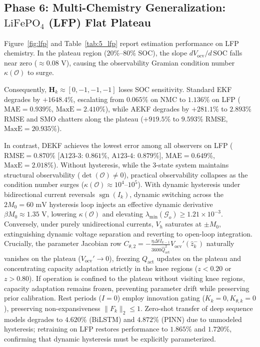 \documentclass[balance,nocopyright,upint,varvw,hyphenate,barcolor=NavyBlue,nolists]{asmejour}
\begin{document}
\subsection[Phase 6: Multi-Chemistry Generalization: LiFePO4 (LFP) Flat Plateau]{Phase 6: Multi-Chemistry Generalization: $\text{LiFePO}_4$ (LFP) Flat Plateau}
Figure~\ref{fig:lfp} and Table~\ref{tab:5_lfp} report estimation performance on LFP chemistry. In the plateau region ($20\%\text{--}80\%$ SOC), the slope $d V_{\text{ocv}} / d\,\text{SOC}$ falls near zero ($\approx 0.08\text{ V}$), causing the observability Gramian condition number $\kappa(\mathcal{O})$ to surge. 

Consequently, $\mathbf{H}_k \approx [0, -1, -1, -1]$ loses SOC sensitivity. Standard EKF degrades by $+1648.4\%$, escalating from $0.065\%$ on NMC to $1.136\%$ on LFP ($\text{MAE} = 0.939\%$, $\text{MaxE} = 2.410\%$), while AEKF degrades by $+281.1\%$ to $2.893\%$ RMSE and SMO chatters along the plateau ($+919.5\%$ to $9.593\%$ RMSE, $\text{MaxE} = 20.935\%$). 

In contrast, DEKF achieves the lowest error among all observers on LFP ($\text{RMSE} = 0.870\%$ [$\text{A123-3}$: $0.861\%$, $\text{A123-4}$: $0.879\%$], $\text{MAE} = 0.649\%$, $\text{MaxE} = 2.018\%$). Without hysteresis, while the 3-state system maintains structural observability ($\det(\mathcal{O}) \ne 0$), practical observability collapses as the condition number surges ($\kappa(\mathcal{O}) \approx 10^4\text{--}10^5$). With dynamic hysteresis under bidirectional current reversals $\operatorname{sgn}(I_k)$, dynamic switching across the $2M_0 = 60\text{ mV}$ hysteresis loop injects an effective dynamic derivative $\beta M_0 \approx 1.35\text{ V}$, lowering $\kappa(\mathcal{O})$ and elevating $\lambda_{\min}(\mathcal{G}_o) \ge 1.21 \times 10^{-3}$. Conversely, under purely unidirectional currents, $V_h$ saturates at $\pm M_0$, extinguishing dynamic voltage separation and reverting to open-loop integration. Crucially, the parameter Jacobian row $C_{\theta,2} = -\frac{\eta\Delta t I_{k-1}}{3600\hat{Q}_{\text{act}}^2} V_{\text{ocv}}'(\hat{z}_k^-)$ naturally vanishes on the plateau ($V_{\text{ocv}}' \to 0$), freezing $Q_{\text{act}}$ updates on the plateau and concentrating capacity adaptation strictly in the knee regions ($z < 0.20$ or $z > 0.80$). If operation is confined to the plateau without visiting knee regions, capacity adaptation remains frozen, preventing parameter drift while preserving prior calibration. Rest periods ($I=0$) employ innovation gating ($K_k=0, K_{\theta,k}=0$), preserving non-expansiveness $\|F_k\|_2 \le 1$. Zero-shot transfer of deep sequence models degrades to $4.620\%$ (BiLSTM) and $4.872\%$ (PINN) due to unmodeled hysteresis; retraining on LFP restores performance to $1.865\%$ and $1.720\%$, confirming that dynamic hysteresis must be explicitly parameterized.
\end{document}
